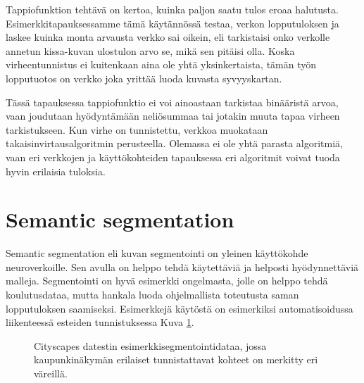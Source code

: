 Tappiofunktion tehtävä on kertoa, kuinka paljon saatu tulos eroaa halutusta.
Esimerkkitapauksessamme tämä käytännössä testaa, verkon lopputuloksen ja laskee kuinka monta arvausta verkko sai oikein,
eli tarkistaisi onko verkolle annetun kissa-kuvan ulostulon arvo se, mikä sen pitäisi olla.
Koska virheentunnistus ei kuitenkaan aina ole yhtä yksinkertaista, tämän työn lopputuotos on verkko joka yrittää luoda kuvasta syvyyskartan.

Tässä tapauksessa tappiofunktio ei voi ainoastaan tarkistaa binääristä arvoa, vaan joudutaan hyödyntämään neliösummaa tai jotakin muuta tapaa virheen tarkistukseen.
Kun virhe on tunnistettu, verkkoa muokataan takaisinvirtausalgoritmin perusteella.
Olemassa ei ole yhtä parasta algoritmiä, vaan eri verkkojen ja käyttökohteiden tapauksessa eri algoritmit voivat tuoda hyvin erilaisia tuloksia.

\section{Semantic segmentation}

Semantic segmentation eli kuvan segmentointi on yleinen käyttökohde neuroverkoille.  
Sen avulla on helppo tehdä käytettäviä ja helposti hyödynnettäviä malleja.  
Segmentointi on hyvä esimerkki ongelmasta, jolle on helppo tehdä koulutusdataa,
mutta hankala luoda ohjelmallista toteutusta saman lopputuloksen saamiseksi.  
Esimerkkejä käytöstä on esimerkiksi automatisoidussa liikenteessä esteiden tunnistuksessa Kuva \ref{fig:labels}.  

\begin{figure}[h]
\centering
{}
\caption[Tämä on lyhyt kuvateksti.]{Cityscapes datestin esimerkkisegmentointidataa, jossa kaupunkinäkymän erilaiset tunnistattavat kohteet on merkitty eri väreillä.}
\label{fig:labels}
\end{figure}

